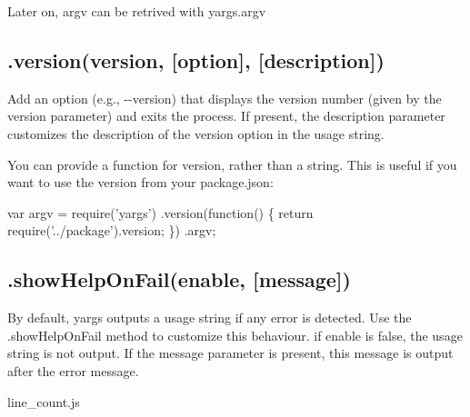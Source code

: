 Later on, {\ttfamily argv} can be retrived with {\ttfamily yargs.\+argv}

\subsection*{.version(version, \mbox{[}option\mbox{]}, \mbox{[}description\mbox{]}) }

Add an option (e.\+g., {\ttfamily -\/-\/version}) that displays the version number (given by the {\ttfamily version} parameter) and exits the process. If present, the {\ttfamily description} parameter customizes the description of the version option in the usage string.

You can provide a {\ttfamily function} for version, rather than a string. This is useful if you want to use the version from your package.\+json\+:


\begin{DoxyCode}
var argv = require(\textcolor{stringliteral}{'yargs'})
  .version(\textcolor{keyword}{function}() \{
    \textcolor{keywordflow}{return} require(\textcolor{stringliteral}{'../package'}).version;
  \})
  .argv;
\end{DoxyCode}


\subsection*{.show\+Help\+On\+Fail(enable, \mbox{[}message\mbox{]}) }

By default, yargs outputs a usage string if any error is detected. Use the {\ttfamily .show\+Help\+On\+Fail} method to customize this behaviour. if {\ttfamily enable} is {\ttfamily false}, the usage string is not output. If the {\ttfamily message} parameter is present, this message is output after the error message.

line\+\_\+count.\+js








